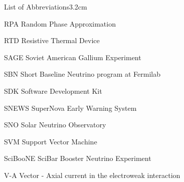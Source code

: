 \begin{mclistof}{List of Abbreviations}{3.2cm}
\item[RPA] Random Phase Approximation
\item[RTD] Resistive Thermal Device
\item[SAGE] Soviet American Gallium Experiment
\item[SBN] Short Baseline Neutrino program at Fermilab
\item[SDK] Software Development Kit
\item[SNEWS] SuperNova Early Warning System
\item[SNO] Solar Neutrino Observatory
\item[SVM] Support Vector Machine
\item[SciBooNE] SciBar Booster Neutrino Experiment
\item[V-A] Vector - Axial current in the electroweak interaction


\end{mclistof} 
